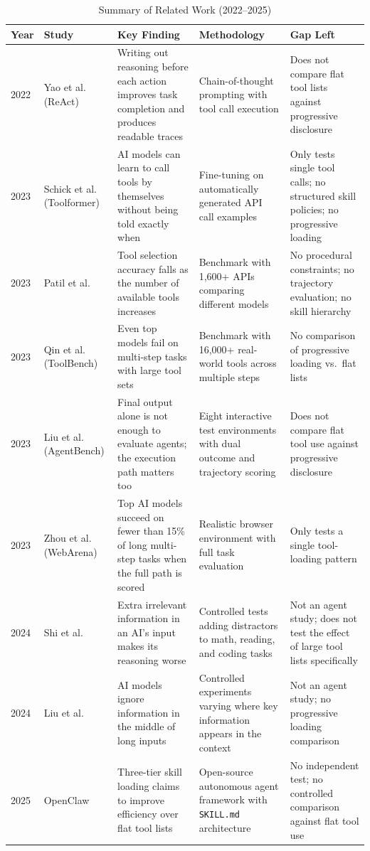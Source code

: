 \begin{table}[h!]
\centering
\small
\caption{Summary of Related Work (2022--2025)}
\label{tab:related-work}
\begin{tabular}{|p{0.65cm}|p{2.3cm}|p{3.5cm}|p{3.0cm}|p{3.9cm}|}
\hline
\textbf{Year} & \textbf{Study} & \textbf{Key Finding} & \textbf{Methodology} & \textbf{Gap Left} \\
\hline
2022 &
Yao et al.\ \cite{yao2022react} (ReAct) &
Writing out reasoning before each action improves task completion and produces readable traces &
Chain-of-thought prompting with tool call execution &
Does not compare flat tool lists against progressive disclosure \\
\hline
2023 &
Schick et al.\ \cite{schick2023toolformer} (Toolformer) &
AI models can learn to call tools by themselves without being told exactly when &
Fine-tuning on automatically generated API call examples &
Only tests single tool calls; no structured skill policies; no progressive loading \\
\hline
2023 &
Patil et al.\ \cite{patil2023gorilla} &
Tool selection accuracy falls as the number of available tools increases &
Benchmark with 1,600+ APIs comparing different models &
No procedural constraints; no trajectory evaluation; no skill hierarchy \\
\hline
2023 &
Qin et al.\ \cite{qin2023toolllm} (ToolBench) &
Even top models fail on multi-step tasks with large tool sets &
Benchmark with 16,000+ real-world tools across multiple steps &
No comparison of progressive loading vs.\ flat lists \\
\hline
2023 &
Liu et al.\ \cite{liu2023agentbench} (AgentBench) &
Final output alone is not enough to evaluate agents; the execution path matters too &
Eight interactive test environments with dual outcome and trajectory scoring &
Does not compare flat tool use against progressive disclosure \\
\hline
2023 &
Zhou et al.\ \cite{zhou2023webarena} (WebArena) &
Top AI models succeed on fewer than 15\% of long multi-step tasks when the full path is scored &
Realistic browser environment with full task evaluation &
Only tests a single tool-loading pattern \\
\hline
2024 &
Shi et al.\ \cite{shi2024context} &
Extra irrelevant information in an AI's input makes its reasoning worse &
Controlled tests adding distractors to math, reading, and coding tasks &
Not an agent study; does not test the effect of large tool lists specifically \\
\hline
2024 &
Liu et al.\ \cite{liu2024lost} &
AI models ignore information in the middle of long inputs &
Controlled experiments varying where key information appears in the context &
Not an agent study; no progressive loading comparison \\
\hline
2025 &
OpenClaw \cite{openclaw_2025} &
Three-tier skill loading claims to improve efficiency over flat tool lists &
Open-source autonomous agent framework with \texttt{SKILL.md} architecture &
No independent test; no controlled comparison against flat tool use \\
\hline
\end{tabular}
\end{table}


